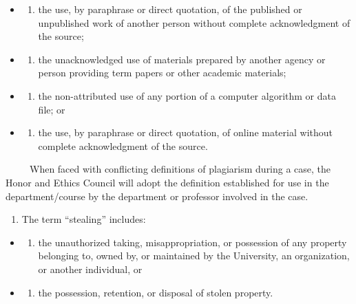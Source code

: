 \documentclass[
]{book}
\providecommand{\tightlist}{%
  \setlength{\itemsep}{0pt}\setlength{\parskip}{0pt}}
\begin{document}
\begin{itemize}
\item
  \begin{enumerate}
  \def\labelenumi{(\alph{enumi})}
  \tightlist
  \item
    the use, by paraphrase or direct quotation, of the published or unpublished work of another person without complete acknowledgment of the source;
  \end{enumerate}
\item
  \begin{enumerate}
  \def\labelenumi{(\alph{enumi})}
  \setcounter{enumi}{1}
  \tightlist
  \item
    the unacknowledged use of materials prepared by another agency or person providing term papers or other academic materials;
  \end{enumerate}
\item
  \begin{enumerate}
  \def\labelenumi{(\alph{enumi})}
  \setcounter{enumi}{2}
  \tightlist
  \item
    the non-attributed use of any portion of a computer algorithm or data file; or
  \end{enumerate}
\item
  \begin{enumerate}
  \def\labelenumi{(\alph{enumi})}
  \setcounter{enumi}{3}
  \tightlist
  \item
    the use, by paraphrase or direct quotation, of online material without complete acknowledgment of the source.
  \end{enumerate}
\end{itemize}

~~~~~When faced with conflicting definitions of plagiarism during a case, the Honor and Ethics Council will adopt the definition established for use in the department/course by the department or professor involved in the case.

\begin{enumerate}
\def\labelenumi{\arabic{enumi}.}
\setcounter{enumi}{2}
\tightlist
\item
  The term ``stealing'' includes:
\end{enumerate}

\begin{itemize}
\item
  \begin{enumerate}
  \def\labelenumi{(\alph{enumi})}
  \tightlist
  \item
    the unauthorized taking, misappropriation, or possession of any property belonging to, owned by, or maintained by the University, an organization, or another individual, or
  \end{enumerate}
\item
  \begin{enumerate}
  \def\labelenumi{(\alph{enumi})}
  \setcounter{enumi}{1}
  \tightlist
  \item
    the possession, retention, or disposal of stolen property.
  \end{enumerate}
\end{itemize}
\end{document}
